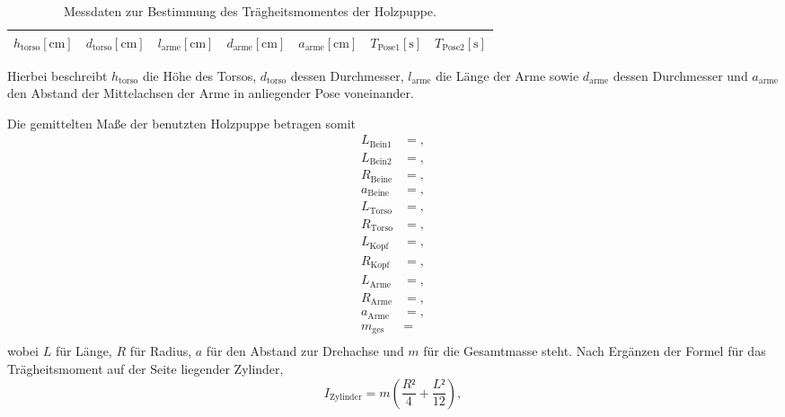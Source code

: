 \begin{table}[H]
  \centering
  \caption{Messdaten zur Bestimmung des Trägheitsmomentes der Holzpuppe.}
  \label{tab:mensch2}
  \begin{tabular}{c c c c c c c}
    \toprule
    {$h_\text{torso} [\si{\centi\metre}]$} & {$d_\text{torso} [\si{\centi\metre}]$} & {$l_\text{arme} [\si{\centi\metre}]$} & {$d_\text{arme} [\si{\centi\metre}]$} & {$a_\text{arme} [\si{\centi\metre}]$} & {$T_{\text{Pose1}} [\si{\second}]$} & {$T_{\text{Pose2}} [\si{\second}]$}  \\
    \midrule
    
    \bottomrule
  \end{tabular}
\end{table}

Hierbei beschreibt $h_\text{torso}$ die Höhe des Torsos, $d_\text{torso}$ dessen Durchmesser, $l_\text{arme}$ die Länge der Arme sowie $d_\text{arme}$ dessen Durchmesser und $a_\text{arme}$ den Abstand der Mittelachsen der Arme in anliegender Pose voneinander.

Die gemittelten Maße der benutzten Holzpuppe betragen somit
\begin{align*}
  L_{\text{Bein1}}  &= , \\
  L_{\text{Bein2}}  &= , \\
  R_{\text{Beine}}   &= , \\
  a_{\text{Beine}}   &= , \\
  L_{\text{Torso}}   &= , \\
  R_{\text{Torso}}   &= , \\
  L_{\text{Kopf}}    &= , \\
  R_{\text{Kopf}}    &= , \\
  L_{\text{Arme}}    &= , \\
  R_{\text{Arme}}    &= , \\
  a_{\text{Arme}}    &= , \\
  m_{\text{ges}}     &=  \\
\end{align*}
wobei $L$ für Länge, $R$ für Radius, $a$ für den Abstand zur Drehachse und $m$ für die Gesamtmasse steht.
Nach Ergänzen der Formel für das Trägheitsmoment auf der Seite liegender Zylinder,
\begin{equation}
  I_{\text{Zylinder}} = m \left( \frac{R²}{4} + \frac{L²}{12} \right),
\end{equation}

